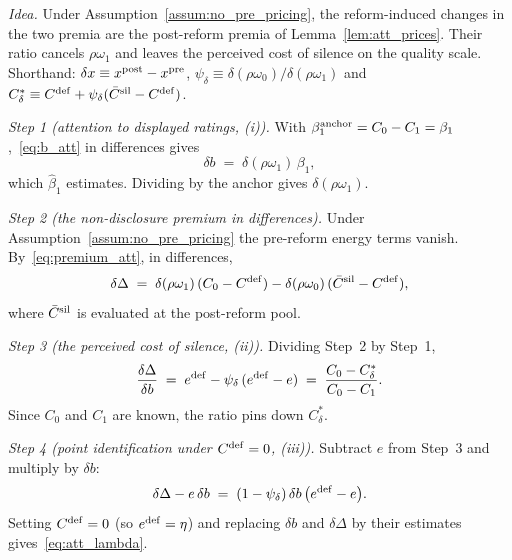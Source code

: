 \upshape
\emph{Idea.} Under Assumption~\ref{assum:no_pre_pricing}, the reform-induced changes in the two premia are the post-reform premia of Lemma~\ref{lem:att_prices}. Their ratio cancels $\rho\omega_1$ and leaves the perceived cost of silence on the quality scale. Shorthand: $\delta x\equiv x^{\rm post}-x^{\rm pre}$, $\psi_\delta\equiv\delta(\rho\omega_0)/\delta(\rho\omega_1)$ and $C^*_\delta\equiv C^{\rm def}+\psi_\delta(\bar C^{\rm sil}-C^{\rm def})$.

\emph{Step 1 (attention to displayed ratings, (i)).} With $\beta_1^{\rm anchor}=C_0-C_1=\beta_1$,~\eqref{eq:b_att} in differences gives
\begin{equation*}
    \delta b\;=\;\delta(\rho\omega_1)\,\beta_1,
\end{equation*}
which $\hat\beta_1$ estimates. Dividing by the anchor gives $\delta(\rho\omega_1)$.

\emph{Step 2 (the non-disclosure premium in differences).} Under Assumption~\ref{assum:no_pre_pricing} the pre-reform energy terms vanish. By~\eqref{eq:premium_att}, in differences,
\begin{equation*}
    \delta\Delta\;=\;\delta(\rho\omega_1)\,(C_0-C^{\rm def})-\delta(\rho\omega_0)\,(\bar C^{\rm sil}-C^{\rm def}),
\end{equation*}
where $\bar C^{\rm sil}$ is evaluated at the post-reform pool.

\emph{Step 3 (the perceived cost of silence, (ii)).} Dividing Step~2 by Step~1,
\begin{equation*}
    \frac{\delta\Delta}{\delta b}\;=\;e^{\rm def}-\psi_\delta\,(e^{\rm def}-e)\;=\;\frac{C_0-C^*_\delta}{C_0-C_1}.
\end{equation*}
Since $C_0$ and $C_1$ are known, the ratio pins down $C^*_\delta$.

\emph{Step 4 (point identification under $C^{\rm def}=0$, (iii)).} Subtract $e$ from Step~3 and multiply by $\delta b$:
\begin{equation*}
    \delta\Delta-e\,\delta b\;=\;(1-\psi_\delta)\,\delta b\,\big(e^{\rm def}-e\big).
\end{equation*}
Setting $C^{\rm def}=0$ (so $e^{\rm def}=\eta$) and replacing $\delta b$ and $\delta\Delta$ by their estimates gives~\eqref{eq:att_lambda}.

